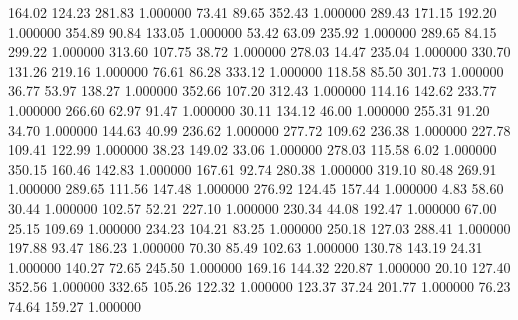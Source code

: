     164.02    124.23    281.83  1.000000
     73.41     89.65    352.43  1.000000
    289.43    171.15    192.20  1.000000
    354.89     90.84    133.05  1.000000
     53.42     63.09    235.92  1.000000
    289.65     84.15    299.22  1.000000
    313.60    107.75     38.72  1.000000
    278.03     14.47    235.04  1.000000
    330.70    131.26    219.16  1.000000
     76.61     86.28    333.12  1.000000
    118.58     85.50    301.73  1.000000
     36.77     53.97    138.27  1.000000
    352.66    107.20    312.43  1.000000
    114.16    142.62    233.77  1.000000
    266.60     62.97     91.47  1.000000
     30.11    134.12     46.00  1.000000
    255.31     91.20     34.70  1.000000
    144.63     40.99    236.62  1.000000
    277.72    109.62    236.38  1.000000
    227.78    109.41    122.99  1.000000
     38.23    149.02     33.06  1.000000
    278.03    115.58      6.02  1.000000
    350.15    160.46    142.83  1.000000
    167.61     92.74    280.38  1.000000
    319.10     80.48    269.91  1.000000
    289.65    111.56    147.48  1.000000
    276.92    124.45    157.44  1.000000
      4.83     58.60     30.44  1.000000
    102.57     52.21    227.10  1.000000
    230.34     44.08    192.47  1.000000
     67.00     25.15    109.69  1.000000
    234.23    104.21     83.25  1.000000
    250.18    127.03    288.41  1.000000
    197.88     93.47    186.23  1.000000
     70.30     85.49    102.63  1.000000
    130.78    143.19     24.31  1.000000
    140.27     72.65    245.50  1.000000
    169.16    144.32    220.87  1.000000
     20.10    127.40    352.56  1.000000
    332.65    105.26    122.32  1.000000
    123.37     37.24    201.77  1.000000
     76.23     74.64    159.27  1.000000
